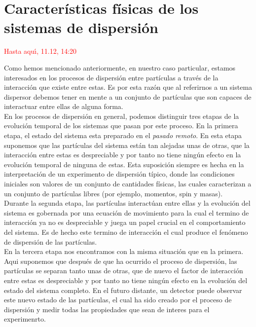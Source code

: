 \documentclass[12pt]{book}
\numberwithin{equation}{chapter}
\begin{document}
\section{Caracter\'isticas f\'isicas de los sistemas de dispersi\'on}
\textcolor{red}{Hasta aqu\'{\i}, 11.12, 14:20}

Como hemos mencionado anteriormente, en nuestro caso particular, estamos interesados en los procesos de dispersi\'on entre part\'iculas a trav\'es de la interacci\'on que existe entre estas. Es por esta raz\'on que al referirnos a un sistema dispersor debemos tener en mente a un conjunto de part\'iculas que son capaces de interactuar entre ellas de alguna forma.\\

En los procesos de dispersi\'on en general, podemos distinguir tres etapas de la evoluci\'on temporal de los sistemas que pasan por este proceso. En la primera etapa, el estado del sistema esta preparado en el \emph{pasado remoto}. En esta etapa suponemos que las part\'iculas del sistema est\'an tan alejadas unas de otras, que la interacci\'on entre estas es despreciable y por tanto no tiene ning\'un efecto en la evoluci\'on temporal de ninguna de estas. Esta suposici\'on siempre es hecha en la interpretaci\'on de un experimento de dispersi\'on t\'ipico, donde las condiciones iniciales son valores de un conjunto de cantidades f\'isicas, las cuales caracterizan a un conjunto de part\'iculas libres (por ejemplo, momentos, spin y masas).\\

Durante la segunda etapa, las part\'iculas interact\'uan entre ellas y la evoluci\'on del sistema es gobernada por una ecuaci\'on de movimiento para la cual el termino de interacci\'on ya no es despreciable y juega un papel crucial en el comportamiento del sistema. Es de hecho este termino de interacci\'on el cual produce el fen\'omeno de dispersi\'on de las part\'iculas.\\

En la tercera etapa nos encontramos con la misma situaci\'on que en la primera. Aqui suponemos que despu\'es de que ha ocurrido el proceso de dispersi\'on, las part\'iculas se separan tanto unas de otras, que de nuevo el factor de interacci\'on entre estas es despreciable y por tanto no tiene ning\'un efecto en la evoluci\'on del estado del sistema completo. En el futuro distante, un detector puede observar este nuevo estado de las part\'iculas, el cual ha sido creado por el proceso de dispersi\'on y medir todas las propiedades que sean de interes para el experimenrto.\\
\end{document}
